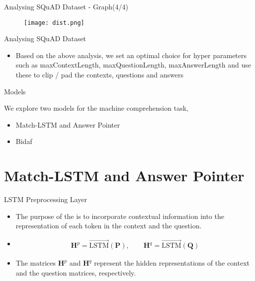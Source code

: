 \documentclass[10pt]{beamer}
\begin{document}
\begin{frame}[fragile]{Analysing SQuAD Dataset - Graph(4/4)}

	\begin{figure}[H]
		\centering
		{\texttt{[image: dist.png]}\label{fig:f1}}
	\end{figure}
\end{frame}

\begin{frame}[fragile]{Analysing SQuAD Dataset}

	\begin{itemize}
		\item Based on the above analysis, we set an optimal choice for hyper parameters such as maxContextLength, maxQuestionLength, maxAnswerLength and use these to clip / pad the contexts, questions and answers
	\end{itemize}
\end{frame}

\begin{frame}[fragile]{Models}

	We explore two models for the machine comprehension task,
	\pause
	\begin{itemize}[<+- | @alert->]
		\item Match-LSTM and Answer Pointer
		\item Bidaf
	\end{itemize}
\end{frame}

\section{Match-LSTM and Answer Pointer}

\begin{frame}[fragile]{LSTM Preprocessing Layer}

	\begin{itemize}[<+- | alert@+>]
		\item The purpose of the  is to incorporate contextual information into the representation of each token in the context and the question.
		\item \begin{align*}
				\boldsymbol{H}^p = \overrightarrow{\text{LSTM}}(\boldsymbol{P}), \quad\quad
				\boldsymbol{H}^q	=	\overrightarrow{\text{LSTM}}(\boldsymbol{Q})
			\end{align*}
		\item The matrices $\boldsymbol{H}^p$ and $\boldsymbol{H}^q$ represent the hidden representations of the context and the question matrices, respectively.
	\end{itemize}
\end{frame}
\end{document}
